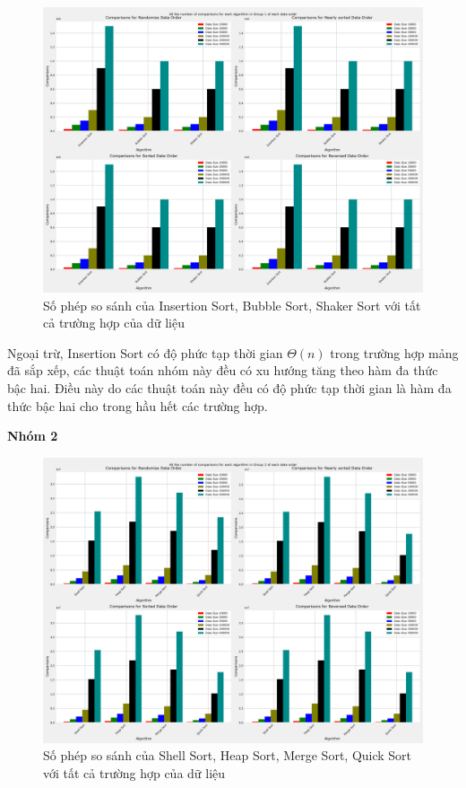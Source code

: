 \begin{figure}[H]
    \centering
    \includegraphics[width=\textwidth]{experimental_result/images/all_the_number_of_comparisons_for_each_algorithm_in_group_1_of_each_data_order.png}
    \caption{Số phép so sánh của Insertion Sort, Bubble Sort, Shaker Sort với tất cả trường hợp của dữ liệu}
    \label{fig:all_the_number_of_comparisons_for_each_algorithm_in_group_1_of_each_data_order}
\end{figure}

Ngoại trừ, Insertion Sort có độ phức tạp thời gian $\Theta(n)$ trong trường hợp mảng đã sắp xếp, các thuật toán nhóm này đều có xu hướng tăng theo hàm đa thức bậc hai. Điều này do các thuật toán này đều có độ phức tạp thời gian là hàm đa thức bậc hai cho trong hầu hết các trường hợp. 


\textbf{Nhóm 2}

\begin{figure}[H]
    \centering
    \includegraphics[width=\textwidth]{experimental_result/images/all_the_number_of_comparisons_for_each_algorithm_in_group_2_of_each_data_order.png}
    \caption{Số phép so sánh của Shell Sort, Heap Sort, Merge Sort, Quick Sort với tất cả trường hợp của dữ liệu}
    \label{fig:all_the_number_of_comparisons_for_each_algorithm_in_group_2_of_each_data_order}
\end{figure}

